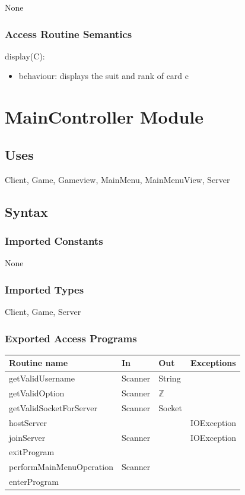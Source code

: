 \documentclass[12pt, titlepage]{article}
\begin{document}
None

\subsubsection* {Access Routine Semantics}

\noindent display(C):
\begin{itemize}
\item behaviour: displays the suit and rank of card c
\end{itemize}


\section* {MainController Module}
    \subsection* {Uses}
        Client, Game, Gameview, MainMenu, MainMenuView, Server
    \subsection* {Syntax}
    
        \subsubsection* {Imported Constants}
            None
        \subsubsection* {Imported Types}
            Client, Game, Server
        \subsubsection* {Exported Access Programs}
        
        \begin{tabular}{| l | l | l | p{5cm} |}
            \hline
            \textbf{Routine name} & \textbf{In} & \textbf{Out} & \textbf{Exceptions}\\
            \hline
            getValidUsername & Scanner & String &\\
            \hline
            getValidOption & Scanner & $\mathbb{Z}$ &\\
            \hline 
            getValidSocketForServer & Scanner & Socket &\\
            \hline 
            hostServer & & & IOException\\
            \hline 
            joinServer & Scanner & & IOException\\
            \hline 
            exitProgram & & &\\
            \hline 
            performMainMenuOperation & Scanner & &\\
            \hline 
            enterProgram & & &\\
            \hline 
        \end{tabular}
        
\end{document}
